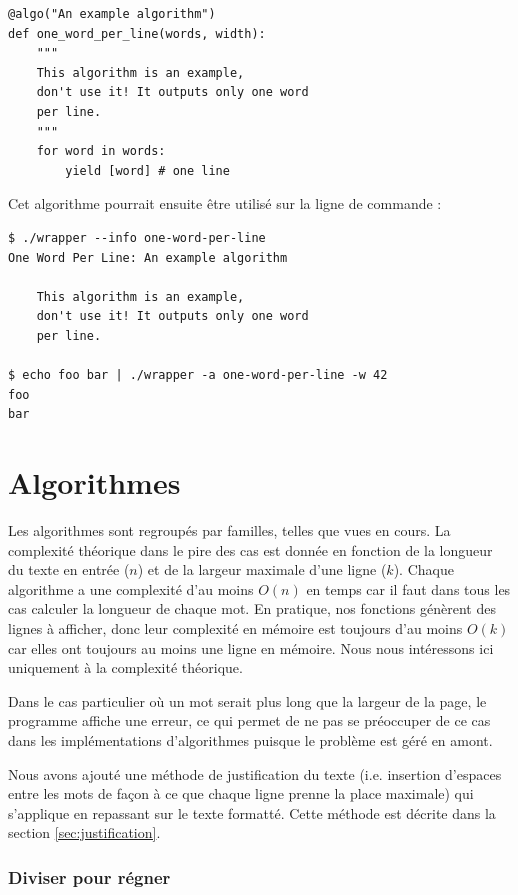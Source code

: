 \documentclass[a4paper, 11pt]{article}
\begin{document}
\begin{verbatim}
@algo("An example algorithm")
def one_word_per_line(words, width):
    """
    This algorithm is an example,
    don't use it! It outputs only one word
    per line.
    """
    for word in words:
        yield [word] # one line
\end{verbatim}

Cet algorithme pourrait ensuite être utilisé sur la ligne de commande :

\begin{verbatim}
$ ./wrapper --info one-word-per-line
One Word Per Line: An example algorithm

    This algorithm is an example,
    don't use it! It outputs only one word
    per line.

$ echo foo bar | ./wrapper -a one-word-per-line -w 42
foo
bar
\end{verbatim}

\part{Algorithmes}

Les algorithmes sont regroupés par familles, telles que vues en cours.
La complexité théorique dans le pire des cas est donnée en fonction de la
longueur du texte en entrée ($n$) et de la largeur maximale d'une ligne ($k$).
Chaque algorithme a une complexité d'au moins $O(n)$ en temps car il faut dans
tous les cas calculer la longueur de chaque mot. En pratique, nos fonctions
génèrent des lignes à afficher, donc leur complexité en mémoire est toujours
d'au moins $O(k)$ car elles ont toujours au moins une ligne en mémoire. Nous
nous intéressons ici uniquement à la complexité théorique.

Dans le cas particulier où un mot serait plus long que la largeur de la page, le
programme affiche une erreur, ce qui permet de ne pas se préoccuper de ce cas
dans les implémentations d'algorithmes puisque le problème est géré en amont.

Nous avons ajouté une méthode de justification du texte (i.e. insertion
d'espaces entre les mots de façon à ce que chaque ligne prenne la place
maximale) qui s'applique en repassant sur le texte formatté. Cette méthode est
décrite dans la section \ref{sec:justification}.

\section{Diviser pour régner}
\end{document}
